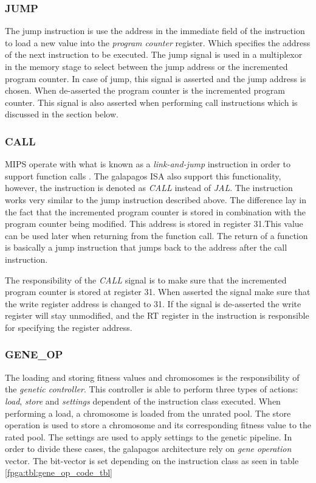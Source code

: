 
\subsubsection{JUMP}
The jump instruction is use the address in the immediate field of the instruction to load a new value into the \emph{program counter} register. Which specifies the address of the next instruction to be executed. The jump signal is used in a multiplexor in the memory stage to select between the jump address or the incremented program counter. In case of jump, this signal is asserted and the jump address is chosen. When de-asserted the program counter is the incremented program counter. This signal is also asserted when performing call instructions which is discussed in the section below.   

\subsubsection{CALL}
MIPS operate with what is known as a \emph{link-and-jump} instruction in order to support function calls \cn. The galapagos ISA also support this functionality, however, the instruction is denoted as \emph{CALL} instead of \emph{JAL}. The instruction works very similar to the jump instruction described above. The difference lay in the fact that the incremented program counter is stored in combination with the program counter being modified. This address is stored in register 31.This value can be used later when returning from the function call. The return of a function is basically a jump instruction that jumps back to the address after the call instruction.

The responsibility of the \emph{CALL} signal is to make sure that the incremented program counter is stored at register 31. When asserted the signal make sure that the write register address is changed to 31. If the signal is de-asserted the write register will stay unmodified, and the RT register in the instruction is responsible for specifying the register address.


\subsubsection{GENE\_OP}
The loading and storing fitness values and chromosomes is the responsibility of the \emph{genetic controller}. This controller is able to perform three types of actions: \emph{load}, \emph{store} and \emph{settings} dependent of the instruction class executed. When performing a load, a chromosome is loaded from the unrated pool. The store operation is used to store a chromosome and its corresponding fitness value to the rated pool. The settings are used to apply settings to the genetic pipeline.  In order to divide these cases, the galapagos architecture rely on \emph{gene operation} vector. The bit-vector is set depending on the instruction class as seen in table \ref{fpga:tbl:gene_op_code_tbl}



